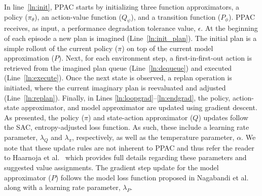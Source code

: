\documentclass{article}
\begin{document}
        In line~\ref{ln:init}, PPAC starts by initializing three function approximators, a policy ($\pi_\theta$), an action-value function ($Q_\psi$), and a transition function ($P_\phi$).  
        PPAC receives, as input, a performance degradation tolerance value, $\epsilon$. 
        At the beginning of each episode a new plan is imagined (Line~\ref{ln:init_plan}). The initial plan is a simple rollout of the current policy ($\pi$) on top of the current model approximation ($P$). Next, for each environment step, a first-in-first-out action is retrieved from the imagined plan queue (Line~\ref{ln:dequeue}) and executed (Line~\ref{ln:execute}). Once the next state is observed, a replan operation is initiated, where the current imaginary plan is reevaluated and adjusted (Line~\ref{ln:replan}). Finally, in Lines \ref{ln:loopgrad}--\ref{ln:endgrad}, the policy, action-state approximator, and model approximator are updated using gradient descent. As presented, the policy ($\pi$) and state-action approximator ($Q$) updates follow the SAC, entropy-adjusted loss function. As such, these include a learning rate parameter, $\lambda_Q$ and $\lambda_\pi$, respectively, as well as the temperature parameter, $\alpha$. We note that these update rules are not inherent to PPAC and thus refer the reader to Haarnoja et al.~\citeyear{haarnoja2018soft} which provides full details regarding these parameters and suggested value assignments.
        The gradient step update for the model approximator ($P$) follows the model loss function proposed in Nagabandi et al.~\citeyear{nagabandi2018neural} along with a learning rate parameter, $\lambda_P$.    %
\end{document}

